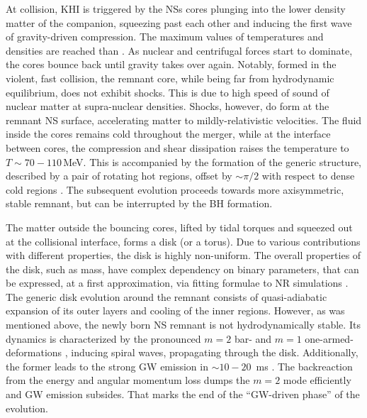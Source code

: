 At collision, \ac{KHI} is triggered by the \acp{NS} cores plunging into the lower density matter of the companion, 
squeezing past each other and inducing the first wave of gravity-driven compression. 
The maximum values of temperatures and densities are reached than \citep{Perego:2019adq}. 
As nuclear and centrifugal forces start to dominate, the cores bounce back until gravity 
takes over again. %
%
Notably, formed in the violent, fast collision, the remnant core, while being far from 
hydrodynamic equilibrium, does not exhibit shocks. This is due to high speed of sound 
of nuclear matter at supra-nuclear densities.
%
Shocks, however, do form at the remnant \ac{NS} surface, accelerating matter to mildly-relativistic 
velocities. %
The fluid inside the cores remains cold 
throughout the merger, while at the interface between cores, the compression and shear 
dissipation raises the temperature to $T\sim70-110\,$MeV.
This is accompanied by the formation of the generic structure, described
by a pair of rotating hot regions, offset by $\sim\pi/2$ with 
respect to dense cold regions \citep{Kastaun:2016yaf}.
%
The subsequent evolution proceeds towards more axisymmetric, stable remnant, but can be 
interrupted by the \ac{BH} formation. 

The matter outside the bouncing cores, lifted by tidal torques and squeezed out at the 
collisional interface, forms a disk (or a torus).
Due to various contributions with different properties, the disk is highly non-uniform.
The overall properties of the disk, such as mass, have complex dependency on 
binary parameters, that can be expressed, at a first approximation, via fitting 
formulae to \ac{NR} simulations \citep{Radice:2017lry,Radice:2018xqa,Radice:2018ozg}. 
The generic disk evolution around the remnant consists of quasi-adiabatic expansion
of its outer layers 
and cooling of the inner regions. 
%
However, as was mentioned above, the newly born \ac{NS} remnant is not hydrodynamically stable. 
Its dynamics is characterized by the pronounced $m=2$ bar- and $m=1$ one-armed-
deformations \citep[\eg][]{Radice:2016gym}, inducing spiral waves, propagating through the 
disk. 
Additionally, the former leads to the strong \ac{GW} emission 
in ${\sim}10-20$~ms \pmerg{}. The backreaction from the energy and angular momentum 
loss dumps the $m=2$ mode efficiently and \ac{GW} emission subsides. 
That marks the end of the ``\ac{GW}-driven phase'' of the \pmerg{} evolution. 

